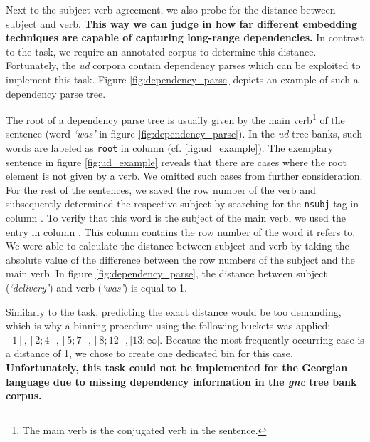  Next to the subject-verb agreement, we also probe for the distance between subject and verb. \textbf{This way we can judge in how far different embedding techniques are capable of capturing long-range dependencies.} In contrast to the  task, we require an annotated corpus to determine this distance. Fortunately, the \textit{\gls{ud}} corpora contain dependency parses which can be exploited to implement this task. Figure \vref{fig:dependency_parse} depicts an example of such a dependency parse tree.

The root of a dependency parse tree is usually given by the main verb\footnote{The main verb is the conjugated verb in the sentence.} of the sentence (word \textit{`was'} in figure \vref{fig:dependency_parse}). In the \textit{\gls{ud}} tree banks, such words are labeled as \texttt{root} in column  (cf. \vref{fig:ud_example}). The exemplary sentence in figure \vref{fig:ud_example} reveals that there are cases where the root element is not given by a verb.    We omitted such cases from further consideration. For the rest of the sentences, we saved the row number of the verb and subsequently determined the respective subject by searching for the \texttt{nsubj} tag in column . To verify that this word is the subject of the main verb, we used the entry in column . This column contains the row number of the word it refers to. We were able to calculate the distance between subject and verb by taking the absolute value of the difference between the row numbers of the subject and the main verb. In figure \vref{fig:dependency_parse}, the distance between subject (\textit{`delivery'}) and verb (\textit{`was'}) is equal to 1.



Similarly to the  task, predicting the exact distance would be too demanding, which is why a binning procedure using the following buckets was applied: $[1], [2;4], [5;7], [8;12], [13;\infty[$. Because the most frequently occurring case is a distance of 1, we chose to create one dedicated bin for this case. \textbf{Unfortunately, this task could not be implemented for the Georgian language due to missing dependency information in the \textit{\gls{gnc}} tree bank corpus.}


